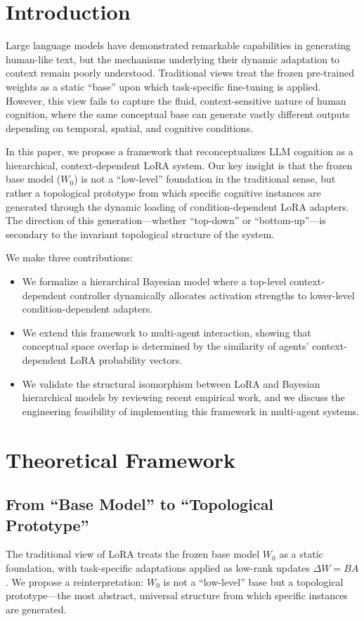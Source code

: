\documentclass[11pt, a4paper]{article}
\begin{document}
\section{Introduction}
Large language models have demonstrated remarkable capabilities in generating human-like text, but the mechanisms underlying their dynamic adaptation to context remain poorly understood. Traditional views treat the frozen pre-trained weights as a static ``base'' upon which task-specific fine-tuning is applied. However, this view fails to capture the fluid, context-sensitive nature of human cognition, where the same conceptual base can generate vastly different outputs depending on temporal, spatial, and cognitive conditions.

In this paper, we propose a framework that reconceptualizes LLM cognition as a hierarchical, context-dependent LoRA system. Our key insight is that the frozen base model ($W_0$) is not a ``low-level'' foundation in the traditional sense, but rather a topological prototype from which specific cognitive instances are generated through the dynamic loading of condition-dependent LoRA adapters. The direction of this generation---whether ``top-down'' or ``bottom-up''---is secondary to the invariant topological structure of the system.

We make three contributions:
\begin{itemize}
  \item We formalize a hierarchical Bayesian model where a top-level context-dependent controller dynamically allocates activation strengths to lower-level condition-dependent adapters.
  \item We extend this framework to multi-agent interaction, showing that conceptual space overlap is determined by the similarity of agents' context-dependent LoRA probability vectors.
  \item We validate the structural isomorphism between LoRA and Bayesian hierarchical models by reviewing recent empirical work, and we discuss the engineering feasibility of implementing this framework in multi-agent systems.
\end{itemize}

\section{Theoretical Framework}

\subsection{From ``Base Model'' to ``Topological Prototype''}
The traditional view of LoRA treats the frozen base model $W_0$ as a static foundation, with task-specific adaptations applied as low-rank updates $\Delta W = BA$. We propose a reinterpretation: $W_0$ is not a ``low-level'' base but a topological prototype---the most abstract, universal structure from which specific instances are generated.
\end{document}
